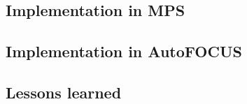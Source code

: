 \subsection{Implementation in MPS}

\subsection{Implementation in AutoFOCUS}

\subsection{Lessons learned}